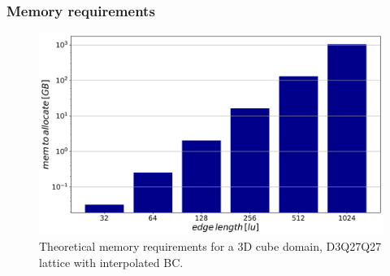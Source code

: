 \documentclass[10pt,handout]{beamer}
\begin{document}
\begin{frame}\frametitle{Memory requirements}
\begin{figure}
\includegraphics[width = 1 \textwidth]{obrazki/log_mem_req.pdf} 
\caption{Theoretical memory requirements for a 3D cube domain, \newline D3Q27Q27 lattice with interpolated BC.}
\end{figure}
\end{frame}
\end{document}
